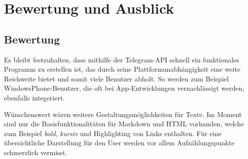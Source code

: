 \chapter{Bewertung und Ausblick}
\section{Bewertung}
Es bleibt festzuhalten, dass mithilfe der Telegram-API schnell ein funktionales Programm zu erstellen ist, das durch seine Plattformunabhängigkeit eine weite Reichweite bietet und somit viele Benutzer abholt. So werden zum Beispiel WindowsPhone-Benutzer, die oft bei App-Entwicklungen vernachlässigt werden, ebenfalls integeriert.

Wünschenswert wären weitere Gestaltungsmöglichkeiten für Texte. Im Moment sind nur die Basisfunktionalitäten für Markdown und HTML vorhanden, welche zum Beispiel \emph{bold}, \emph{kursiv} und Highlighting von Links enthalten.
Für eine übersichtliche Darstellung für den User werden vor allem Aufzählungspunkte schmerzlich vermisst.
